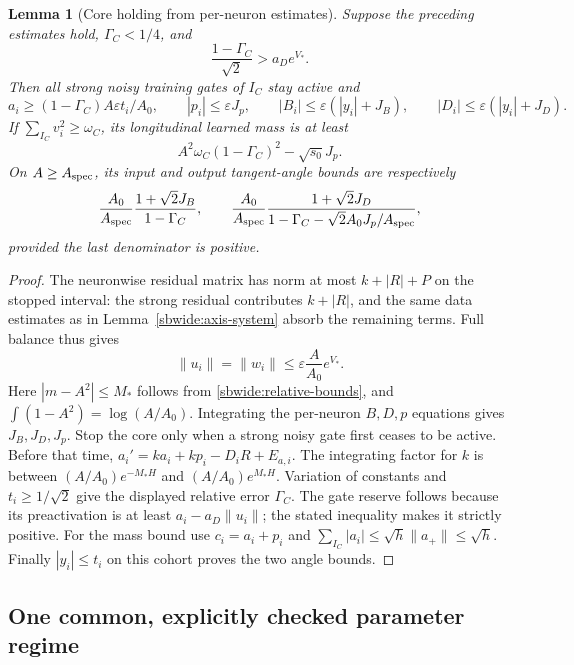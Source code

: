 \documentclass{article} %
\theoremstyle{plain}
\newtheorem{lemma}[theorem]{Lemma}
\theoremstyle{definition}
\theoremstyle{remark}
\begin{document}
\begin{lemma}[Core holding from per-neuron estimates]
\label{sbwide:core-holding}
Suppose the preceding estimates hold, $\Gamma_C<1/4$, and
\[
 \frac{1-\Gamma_C}{\sqrt2}>a_De^{V_*}.
\]
Then all strong noisy training gates of $I_C$ stay active and
\[
 a_i\ge(1-\Gamma_C)A\varepsilon t_i/A_0,\qquad
 |p_i|\le\varepsilon J_p,\qquad
 |B_i|\le\varepsilon(|y_i|+J_B),\qquad
 |D_i|\le\varepsilon(|y_i|+J_D).
\]
If $\sum_{I_C}v_i^2\ge\omega_C$, its longitudinal learned mass is at least
\begin{equation}\label{sbwide:core-mass}
 A^2\omega_C(1-\Gamma_C)^2-\sqrt{s_0}J_p.
\end{equation}
On $A\ge A_{\rm spec}$, its input and output tangent-angle bounds are
respectively
\[
 \frac{A_0}{A_{\rm spec}}
 \frac{1+\sqrt2J_B}{1-\Gamma_C},\qquad
 \frac{A_0}{A_{\rm spec}}
 \frac{1+\sqrt2J_D}
 {1-\Gamma_C-\sqrt2 A_0J_p/A_{\rm spec}},
\]
provided the last denominator is positive.
\end{lemma}
\begin{proof}
The neuronwise residual matrix has norm at most
$k+|R|+P$ on the stopped interval: the strong residual contributes
$k+|R|$, and the same data estimates as in
Lemma~\ref{sbwide:axis-system} absorb the remaining terms.
Full balance thus gives
\[
 \|u_i\|=\|w_i\|\le\varepsilon\frac A{A_0}e^{V_*}.
\]
Here $|m-A^2|\le M_*$ follows from \eqref{sbwide:relative-bounds},
and $\int(1-A^2)=\log(A/A_0)$.
Integrating the per-neuron $B,D,p$ equations gives $J_B,J_D,J_p$.
Stop the core only when a strong noisy gate first ceases to be active.
Before that time,
$a_i'=ka_i+kp_i-D_iR+E_{a,i}$.
The integrating factor for $k$ is between
$(A/A_0)e^{-M_*H}$ and $(A/A_0)e^{M_*H}$.
Variation of constants and $t_i\ge1/\sqrt2$ give the displayed
relative error $\Gamma_C$.
The gate reserve follows because its preactivation is at least
$a_i-a_D\|u_i\|$; the stated inequality makes it strictly positive.
For the mass bound use $c_i=a_i+p_i$ and
$\sum_{I_C}|a_i|\le\sqrt h\|a_+\|\le\sqrt h$.
Finally $|y_i|\le t_i$ on this cohort proves the two angle bounds.
\end{proof}

\subsection{One common, explicitly checked parameter regime}
\end{document}
